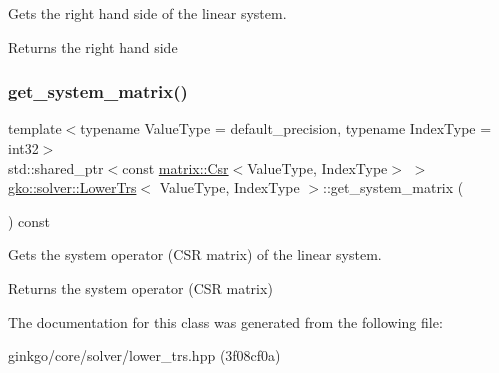 Gets the right hand side of the linear system. 

\begin{DoxyReturn}{Returns}
the right hand side 
\end{DoxyReturn}
\mbox{\label{classgko_1_1solver_1_1LowerTrs_a1f18336cc86c363eb41da44c2d282497}} 
\subsubsection{\texorpdfstring{get\+\_\+system\+\_\+matrix()}{get\_system\_matrix()}}
{\footnotesize\ttfamily template$<$typename Value\+Type  = default\+\_\+precision, typename Index\+Type  = int32$>$ \\
std\+::shared\+\_\+ptr$<$const \hyperlink{classgko_1_1matrix_1_1Csr}{matrix\+::\+Csr}$<$Value\+Type, Index\+Type$>$ $>$ \hyperlink{classgko_1_1solver_1_1LowerTrs}{gko\+::solver\+::\+Lower\+Trs}$<$ Value\+Type, Index\+Type $>$\+::get\+\_\+system\+\_\+matrix (\begin{DoxyParamCaption}{ }\end{DoxyParamCaption}) const\hspace{0.3cm}{\ttfamily [inline]}}



Gets the system operator (C\+SR matrix) of the linear system. 

\begin{DoxyReturn}{Returns}
the system operator (C\+SR matrix) 
\end{DoxyReturn}


The documentation for this class was generated from the following file\+:\begin{DoxyCompactItemize}
\item 
ginkgo/core/solver/lower\+\_\+trs.\+hpp (3f08cf0a)\end{DoxyCompactItemize}

